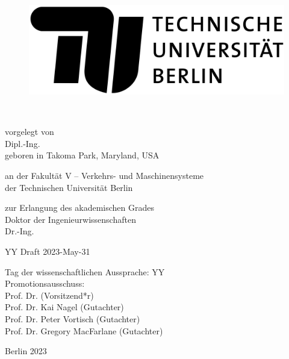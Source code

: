 
\thispagestyle{empty}

\begin{flushright}

	\begin{figure}[!h]
  	\begin{minipage}{1.62\linewidth}
	\begin{center}
	\includegraphics[scale=0.085]{chapters/title/tu-logo-2023.png}
  	\end{center}
  	\end{minipage}
	\end{figure}

	\vspace{20mm}

	\LARGE

	\textbf{\hspace{60mm}\Title} \\[2cm]

	\hrulefill

	\large
	vorgelegt von\\

	Dipl.-Ing. \Autor\\
	geboren in Takoma Park, Maryland, USA\\
	\vspace{10mm}

	an der Fakultät V -- Verkehrs- und Maschinensysteme\\
	der Technischen Universität Berlin

	zur Erlangung des akademischen Grades\\
	Doktor der Ingenieurwissenschaften\\
	Dr.-Ing.\\
	\vspace{5mm}

	YY Draft 2023-May-31\\

	\hrulefill

 	Tag der wissenschaftlichen Aussprache: YY  \\

	\vspace{5mm}
	Promotionsausschuss:\\
	Prof. Dr. (Vorsitzend*r)\\
    	Prof. Dr. Kai Nagel (Gutachter)\\
    	Prof. Dr. Peter Vortisch (Gutachter)\\
    	Prof. Dr. Gregory MacFarlane (Gutachter)\\
	\vspace{6mm}

	Berlin 2023\\

\end{flushright}
